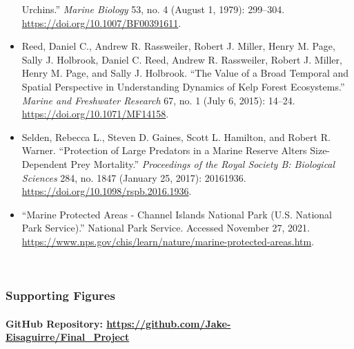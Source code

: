 \documentclass[
]{article}
\begin{document}
\begin{itemize}
  Urchins.'' \emph{Marine Biology} 53, no. 4 (August 1, 1979): 299--304.
  \url{https://doi.org/10.1007/BF00391611}.
\item
  Reed, Daniel C., Andrew R. Rassweiler, Robert J. Miller, Henry M.
  Page, Sally J. Holbrook, Daniel C. Reed, Andrew R. Rassweiler, Robert
  J. Miller, Henry M. Page, and Sally J. Holbrook. ``The Value of a
  Broad Temporal and Spatial Perspective in Understanding Dynamics of
  Kelp Forest Ecosystems.'' \emph{Marine and Freshwater Research} 67,
  no. 1 (July 6, 2015): 14--24. \url{https://doi.org/10.1071/MF14158}.
\item
  Selden, Rebecca L., Steven D. Gaines, Scott L. Hamilton, and Robert R.
  Warner. ``Protection of Large Predators in a Marine Reserve Alters
  Size-Dependent Prey Mortality.'' \emph{Proceedings of the Royal
  Society B: Biological Sciences} 284, no. 1847 (January 25, 2017):
  20161936. \url{https://doi.org/10.1098/rspb.2016.1936}.
\item
  ``Marine Protected Areas - Channel Islands National Park (U.S.
  National Park Service).'' National Park Service. Accessed November 27,
  2021.
  \url{https://www.nps.gov/chis/learn/nature/marine-protected-areas.htm}.
\end{itemize}

~

\hypertarget{section}{%
\subsubsection{}\label{section}}

\hypertarget{supporting-figures}{%
\subsubsection{Supporting Figures}\label{supporting-figures}}

\hypertarget{github-repository-httpsgithub.comjake-eisaguirrefinal_project}{%
\paragraph{\texorpdfstring{GitHub Repository:
\url{https://github.com/Jake-Eisaguirre/Final_Project}}{GitHub Repository: https://github.com/Jake-Eisaguirre/Final\_Project}}\label{github-repository-httpsgithub.comjake-eisaguirrefinal_project}}
\end{document}
